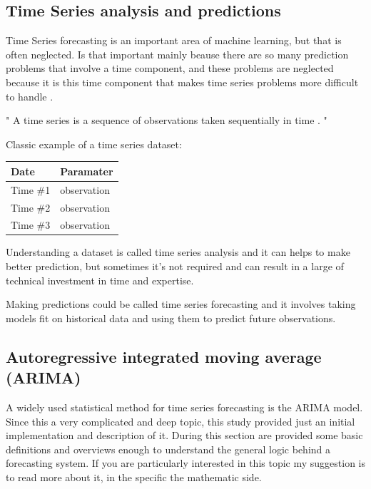 \newpage

\subsection{Time Series analysis and predictions}
  \vspace{-5mm}
Time Series forecasting is an important area of machine learning, but that is often neglected. Is that important mainly beause there are so many prediction problems that involve a time component, and these problems are neglected because it is this time component that makes time series problems more difficult to handle \cite{previousWork}.

" A time series is a sequence of observations taken sequentially in time \cite{TimeSeries}. " 

Classic example of a time series dataset:

\begin{tabular}{ | l | l | }
\hline 		\textbf{Date}	&	\textbf{Paramater} \\ \hline
				Time \#1	&	observation \\ \hline	
				Time \#2	&	observation \\ \hline	
				Time \#3	&	observation \\ \hline											
\end{tabular}

Understanding a dataset is called time series analysis and it can helps to make better prediction, but sometimes it's not required and can result in a large of technical investment in time and expertise.

Making predictions could be called time series forecasting and it involves taking models fit on historical data and using them to predict future observations.

\subsection{Autoregressive integrated moving average (ARIMA)}
\vspace{-5mm}
A widely used statistical method for time series forecasting is the ARIMA model. Since this a very complicated and deep topic, this study provided just an initial implementation and description of it. During this section are provided some basic definitions and overviews enough to understand the general logic behind a forecasting system. If you are particularly interested in this topic my suggestion is to read more about it, in the specific the mathematic side.


